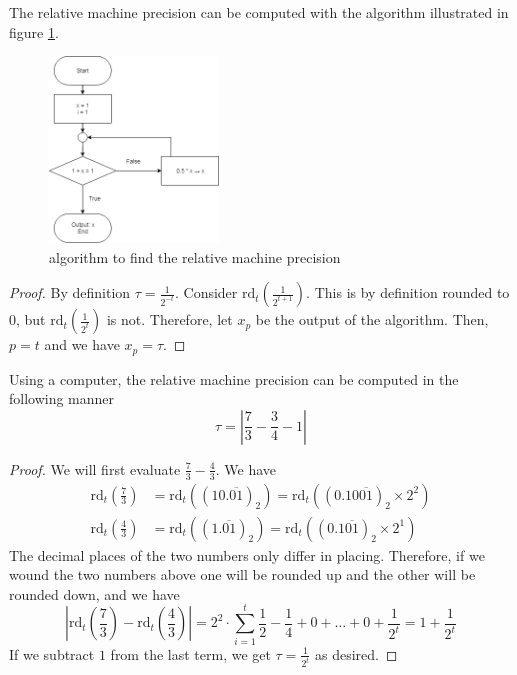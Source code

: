 \begin{theorem}
    The relative machine precision can be computed with the algorithm illustrated in figure \ref{fig:epsilon}.
    \begin{figure}[h]
        \centering
            \includegraphics[width=0.4\textwidth]{graphics/machine_epsilon_flowchart}
        \caption{algorithm to find the relative machine precision}\label{fig:epsilon}
      \end{figure}
\begin{proof}
    By definition \(\tau = \frac{1}{2^{-t}}\). Consider \(\text{rd}_t(\frac{1}{2^{t+1}})\). This is by definition rounded to 0, but \(\text{rd}_t(\frac{1}{2^{t}})\) is not. Therefore, let \(x_p\) be the output of the algorithm. Then, \(p = t\) and we have \(x_p = \tau\).
\end{proof}
\end{theorem}

\begin{theorem}
    Using a computer, the relative machine precision can be computed in the following manner
    \begin{equation*}
        \tau = \left|\frac{7}{3} - \frac{3}{4} - 1\right|
    \end{equation*}
\begin{proof}
    We will first evaluate \(\frac{7}{3} - \frac{4}{3}\). We have
    \begin{align}
        \text{rd}_t(\frac{7}{3}) &= \text{rd}_t((10.\overline{01})_2) = \text{rd}_t((0.10\overline{01})_2 \times 2^2) \\
        \text{rd}_t(\frac{4}{3}) &= \text{rd}_t((1.\overline{01})_2) = \text{rd}_t((0.1\overline{01})_2 \times 2^1)
    \end{align}
    The decimal places of the two numbers only differ in placing. Therefore, if we wound the two numbers above one will be rounded up and the other will be rounded down, and we have
    \begin{equation*}
        \left|\text{rd}_t(\frac{7}{3}) - \text{rd}_t(\frac{4}{3})\right| = 2^2 \cdot \sum_{i=1}^{t} \frac{1}{2} - \frac{1}{4} + 0 + \dots + 0 + \frac{1}{2^t} = 1 + \frac{1}{2^t}
    \end{equation*}
    If we subtract \(1\) from the last term, we get \(\tau = \frac{1}{2^t}\) as desired.
\end{proof}
\end{theorem}